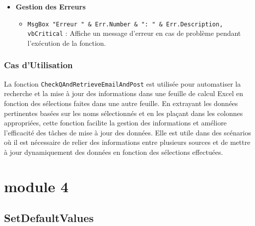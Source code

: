 \documentclass[a4paper, oneside, 12pt, final]{extreport}
\begin{document}
\begin{itemize}
    \item \textbf{Gestion des Erreurs}
    \begin{itemize}
        \item \texttt{MsgBox "Erreur " \& Err.Number \& ": " \& Err.Description, vbCritical} : Affiche un message d'erreur en cas de problème pendant l'exécution de la fonction.
    \end{itemize}
\end{itemize}

\subsubsection{Cas d'Utilisation}

La fonction \texttt{CheckQAndRetrieveEmailAndPost} est utilisée pour automatiser la recherche et la mise à jour des informations dans une feuille de calcul Excel en fonction des sélections faites dans une autre feuille. En extrayant les données pertinentes basées sur les noms sélectionnés et en les plaçant dans les colonnes appropriées, cette fonction facilite la gestion des informations et améliore l'efficacité des tâches de mise à jour des données. Elle est utile dans des scénarios où il est nécessaire de relier des informations entre plusieurs sources et de mettre à jour dynamiquement des données en fonction des sélections effectuées.

\section{module 4}
\subsection{SetDefaultValues}
\end{document}
